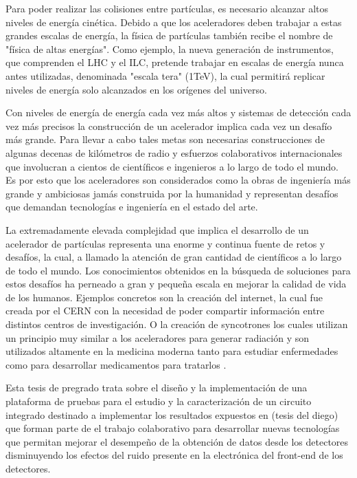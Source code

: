 Para poder realizar las colisiones entre partículas, es necesario alcanzar altos niveles de energía cinética. Debido a que los aceleradores deben trabajar a estas grandes escalas de energía, la física de partículas también recibe el nombre de "física de altas energías". Como ejemplo, la nueva generación de instrumentos, que comprenden el LHC y el ILC, pretende trabajar en escalas de energía nunca antes utilizadas, denominada "escala tera" (1TeV), la cual permitirá replicar niveles de energía solo alcanzados en los orígenes del universo. 

Con niveles de energía de energía cada vez más altos y sistemas de detección cada vez más precisos la construcción de un acelerador implica cada vez un desafío más grande. Para llevar a cabo tales metas son necesarias construcciones de algunas decenas de kilómetros de radio y esfuerzos colaborativos internacionales que involucran a cientos de científicos e ingenieros a lo largo de todo el mundo. Es por esto que los aceleradores son considerados como la obras de ingeniería más grande y ambiciosas jamás construida por la humanidad y representan desafíos que demandan tecnologías e ingeniería en el estado del arte.

La extremadamente elevada complejidad que implica el desarrollo de un acelerador de partículas representa una enorme y continua fuente de retos y desafíos, la cual, a llamado la atención de gran cantidad de científicos a lo largo de todo el mundo. Los conocimientos obtenidos en la búsqueda de soluciones para estos desafíos ha perneado a gran y pequeña escala en mejorar la calidad de vida de los humanos. Ejemplos concretos son la creación del internet, la cual fue creada por el CERN con la necesidad de poder compartir información entre distintos centros de investigación. O la creación de syncotrones los cuales utilizan un principio muy similar a los aceleradores para generar radiación y son utilizados altamente en la medicina moderna tanto para estudiar enfermedades como para desarrollar medicamentos para tratarlos \citep{tuttle101}.

Esta tesis de pregrado trata sobre el diseño y la implementación de una plataforma de pruebas para el estudio y  la caracterización de un circuito integrado destinado a implementar los resultados expuestos en (tesis del diego) que forman parte de el trabajo colaborativo para desarrollar nuevas tecnologías que permitan mejorar el desempeño de la obtención de datos desde los detectores disminuyendo los efectos del ruido presente en la electrónica del front-end de los detectores.

